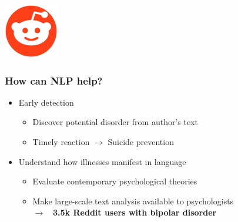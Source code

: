 \begin{frame}
\begin{center}
  \includegraphics[width=90,height=90, keepaspectratio]{fig/reddit1.png}
  \end{center}
\end{frame}

\begin{frame}
  \frametitle{How can NLP help?}
  \centering
  \begin{itemize}
    \item Early detection
    \begin{itemize}
        \item Discover potential disorder from author's text
        \item Timely reaction $\rightarrow$ Suicide prevention
    \end{itemize}
    \pause
    \item Understand how illnesses manifest in language
    \begin{itemize}
        \item Evaluate contemporary psychological theories %
        \item Make large-scale text analysis available to psychologists\\
        $\rightarrow$ \textbf{~3.5k Reddit users with bipolar disorder}
    \end{itemize}

  \end{itemize}
\end{frame}


